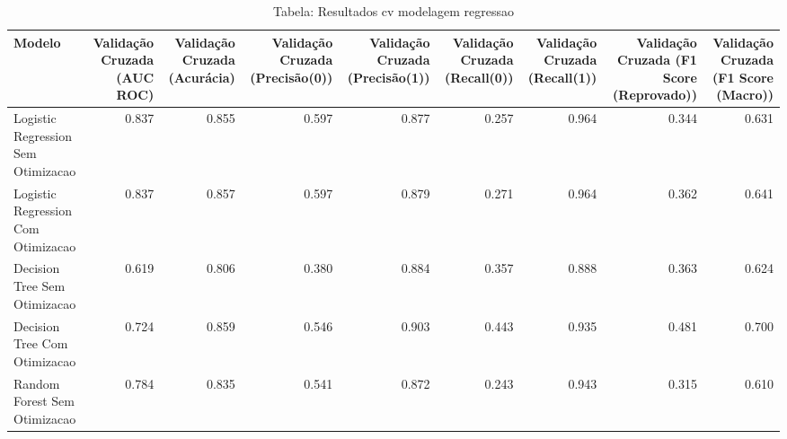 \begin{table}[H] %
    \centering
    \caption{Tabela: Resultados cv modelagem regressao}
    \label{tab:resultados_cv_modelagem_regressao}
    \renewcommand{\arraystretch}{1.25} %
    \begin{adjustwidth}{ -1in }{ -1in } %
    \centering %
    \small %
    \begin{tabular}{lrrrrrrrr}
\toprule
                            Modelo &  Validação Cruzada (AUC ROC) &  Validação Cruzada (Acurácia) &  Validação Cruzada (Precisão(0)) &  Validação Cruzada (Precisão(1)) &  Validação Cruzada (Recall(0)) &  Validação Cruzada (Recall(1)) &  Validação Cruzada (F1 Score (Reprovado)) &  Validação Cruzada (F1 Score (Macro)) \\
\midrule
Logistic Regression Sem Otimizacao &                        0.837 &                         0.855 &                            0.597 &                            0.877 &                          0.257 &                          0.964 &                                     0.344 &                                 0.631 \\
Logistic Regression Com Otimizacao &                        0.837 &                         0.857 &                            0.597 &                            0.879 &                          0.271 &                          0.964 &                                     0.362 &                                 0.641 \\
      Decision Tree Sem Otimizacao &                        0.619 &                         0.806 &                            0.380 &                            0.884 &                          0.357 &                          0.888 &                                     0.363 &                                 0.624 \\
      Decision Tree Com Otimizacao &                        0.724 &                         0.859 &                            0.546 &                            0.903 &                          0.443 &                          0.935 &                                     0.481 &                                 0.700 \\
      Random Forest Sem Otimizacao &                        0.784 &                         0.835 &                            0.541 &                            0.872 &                          0.243 &                          0.943 &                                     0.315 &                                 0.610 \\

\end{tabular}
\end{adjustwidth}
\end{table}
